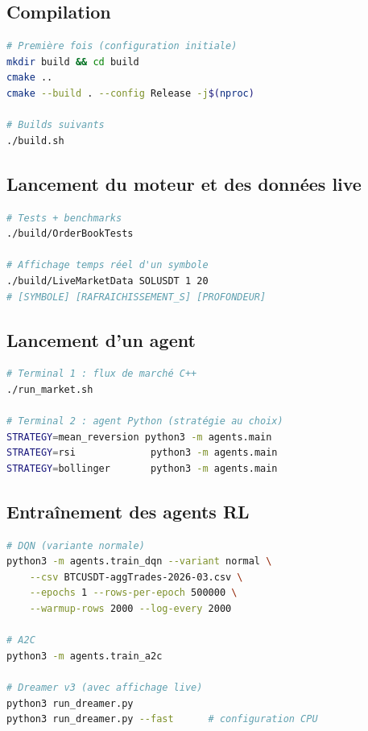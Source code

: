 \documentclass[11pt,a4paper]{article}
\begin{document}
\subsection{Compilation}

\begin{lstlisting}[language=bash]
# Première fois (configuration initiale)
mkdir build && cd build
cmake ..
cmake --build . --config Release -j$(nproc)

# Builds suivants
./build.sh
\end{lstlisting}

\subsection{Lancement du moteur et des données live}

\begin{lstlisting}[language=bash]
# Tests + benchmarks
./build/OrderBookTests

# Affichage temps réel d'un symbole
./build/LiveMarketData SOLUSDT 1 20
# [SYMBOLE] [RAFRAICHISSEMENT_S] [PROFONDEUR]
\end{lstlisting}

\subsection{Lancement d'un agent}

\begin{lstlisting}[language=bash]
# Terminal 1 : flux de marché C++
./run_market.sh

# Terminal 2 : agent Python (stratégie au choix)
STRATEGY=mean_reversion python3 -m agents.main
STRATEGY=rsi             python3 -m agents.main
STRATEGY=bollinger       python3 -m agents.main
\end{lstlisting}

\subsection{Entraînement des agents RL}

\begin{lstlisting}[language=bash]
# DQN (variante normale)
python3 -m agents.train_dqn --variant normal \
    --csv BTCUSDT-aggTrades-2026-03.csv \
    --epochs 1 --rows-per-epoch 500000 \
    --warmup-rows 2000 --log-every 2000

# A2C
python3 -m agents.train_a2c

# Dreamer v3 (avec affichage live)
python3 run_dreamer.py
python3 run_dreamer.py --fast      # configuration CPU
\end{lstlisting}
\end{document}

